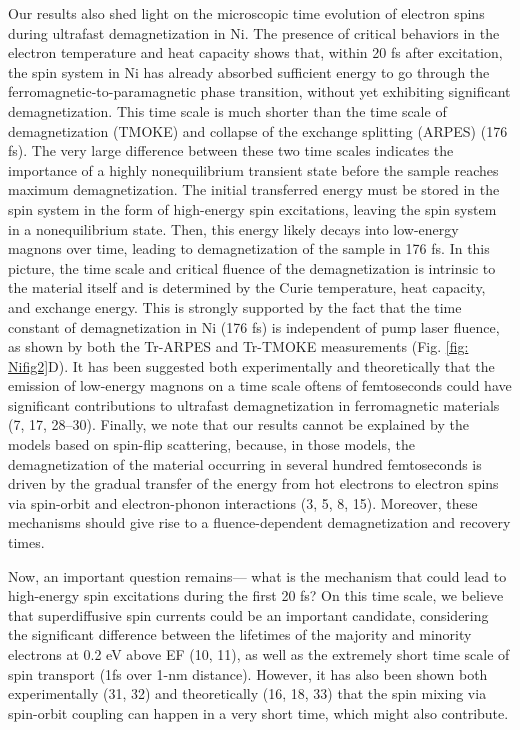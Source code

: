 Our results also shed light on the microscopic time evolution of electron spins during ultrafast demagnetization in Ni. The presence of critical behaviors in the electron temperature and heat capacity shows that, within 20 fs after excitation, the spin system in Ni has already absorbed sufficient energy to go through the ferromagnetic-to-paramagnetic phase transition, without yet exhibiting significant demagnetization. This time scale is much shorter than the time scale of demagnetization (TMOKE) and collapse of the exchange splitting (ARPES) (176 fs). The very large difference between these two time scales indicates the importance of a highly nonequilibrium transient state before the sample reaches maximum demagnetization. The initial transferred energy must be stored in the spin system in the form of high-energy spin excitations, leaving the spin system in a nonequilibrium state. Then, this energy likely decays into low-energy magnons over time, leading to demagnetization of the sample in 176 fs. In this picture, the time scale and critical fluence of the demagnetization is intrinsic to the material itself and is determined by the Curie temperature, heat capacity, and exchange energy. This is strongly supported by the fact that the time constant of demagnetization in Ni (176 fs) is independent of pump laser fluence, as shown by both the Tr-ARPES and Tr-TMOKE measurements (Fig. \ref{fig: Nifig2}D). It has been suggested both experimentally and theoretically that the emission of low-energy magnons on a time scale oftens of femtoseconds could have significant contributions to ultrafast demagnetization in ferromagnetic materials (7, 17, 28–30). Finally, we note that our results cannot be explained by the models based on spin-flip scattering, because, in those models, the demagnetization of the material occurring in several hundred femtoseconds is driven by the gradual transfer of the energy from hot electrons to electron spins via spin-orbit and electron-phonon interactions (3, 5, 8, 15). Moreover, these mechanisms should give rise to a fluence-dependent demagnetization and recovery times.

Now, an important question remains— what is the mechanism that could lead to high-energy spin excitations during the first 20 fs? On this time scale, we believe that superdiffusive spin currents could be an important candidate, considering the significant difference between the lifetimes of the majority and minority electrons at 0.2 eV above EF (10, 11), as well as the extremely short time scale of spin transport (1fs over 1-nm distance). However, it has also been shown both experimentally (31, 32) and theoretically (16, 18, 33) that the spin mixing via spin-orbit coupling can happen in a very short time, which might also contribute.

